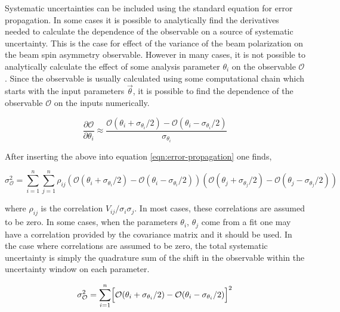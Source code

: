 
Systematic uncertainties can be included using the standard equation for error propagation.  In some cases it is possible to analytically find the derivatives needed to calculate the dependence of the observable on a source of systematic uncertainty.  This is the case for effect of the variance of the beam polarization on the beam spin asymmetry observable.  However in many cases, it is not possible to analytically calculate the effect of some analysis parameter $\theta_i$ on the observable $\mathcal{O}$.  Since the observable is usually calculated using some computational chain which starts with the input parameters $\vec{\theta}$, it is possible to find the dependence of the observable $\mathcal{O}$ on the inputs numerically.

\begin{equation}
  \frac{\partial \mathcal{O}}{ \partial \theta_i} \approx \frac{\mathcal{O}(\theta_i + \sigma_{\theta_i}/2) - \mathcal{O}(\theta_i - \sigma_{\theta_i}/2)}{\sigma_{\theta_i}}
\end{equation}

After inserting the above into equation \ref{eqn:error-propagation} one finds,

\begin{equation}
  \sigma_{\mathcal{O}}^{2} = \sum_{i=1}^{n} \sum_{j=1}^{n} \rho_{ij} (\mathcal{O}(\theta_i + \sigma_{\theta_i}/2) - \mathcal{O}(\theta_i - \sigma_{\theta_i}/2)) (\mathcal{O}(\theta_j + \sigma_{\theta_j}/2) - \mathcal{O}(\theta_j - \sigma_{\theta_j}/2)) 
\end{equation}

where $\rho_{ij}$ is the correlation $V_{ij}/\sigma_i \sigma_j$.  In most cases, these correlations are assumed to be zero.  In some cases, when the parameters $\theta_i$, $\theta_j$ come from a fit one may have a correlation provided by the covariance matrix and it should be used.  In the case where correlations are assumed to be zero, the total systematic uncertainty is simply the quadrature sum of the shift in the observable within the uncertainty window on each parameter.

\begin{equation}
  \sigma_{\mathcal{O}}^{2} = \sum_{i=1}^{n} \Bigl[ \mathcal{O}(\theta_i + \sigma_{\theta_i}/2) - \mathcal{O}(\theta_i - \sigma_{\theta_i}/2) \Bigr]^2
\end{equation}

